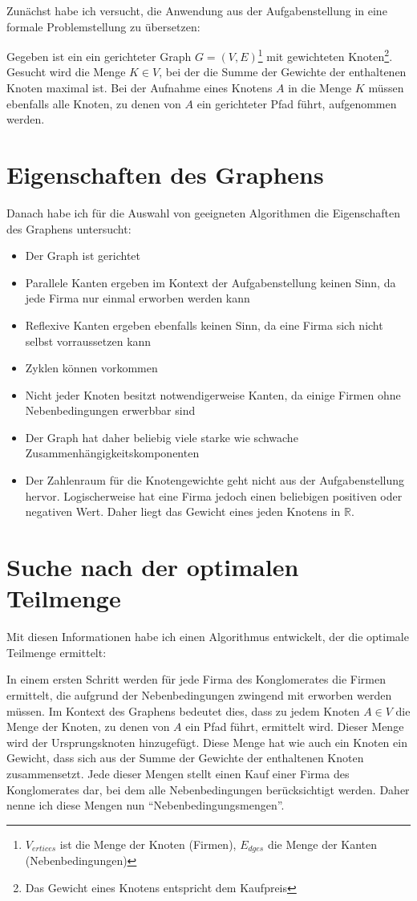 Zunächst habe ich versucht, die Anwendung aus der Aufgabenstellung in eine formale Problemstellung zu übersetzen:
\begin{displayquote}
	Gegeben ist ein ein gerichteter Graph \(G=(V,E)\)\footnote{\(V_{ertices}\) ist die Menge der Knoten (Firmen), \(E_{dges}\) die Menge der Kanten (Nebenbedingungen)} mit gewichteten Knoten\footnote{Das Gewicht eines Knotens entspricht dem Kaufpreis}. Gesucht wird die Menge \(K \in V\), bei der die Summe der Gewichte der enthaltenen Knoten maximal ist. Bei der Aufnahme eines Knotens  \(A\) in die Menge \(K\) müssen ebenfalls alle Knoten, zu denen von \(A\) ein gerichteter Pfad führt, aufgenommen werden.
\end{displayquote}

\section{Eigenschaften des Graphens}
Danach habe ich für die Auswahl von geeigneten Algorithmen die Eigenschaften des Graphens untersucht:
\begin{itemize}
	\item Der Graph ist gerichtet
	\item Parallele Kanten ergeben im Kontext der Aufgabenstellung keinen Sinn, da jede Firma nur einmal erworben werden kann
	\item Reflexive Kanten ergeben ebenfalls keinen Sinn, da eine Firma sich nicht selbst vorraussetzen kann
	\item Zyklen können vorkommen
	\item Nicht jeder Knoten besitzt notwendigerweise Kanten, da einige Firmen ohne Nebenbedingungen erwerbbar sind
	\item Der Graph hat daher beliebig viele starke wie schwache Zusammenhängigkeitskomponenten
	\item Der Zahlenraum für die Knotengewichte geht nicht aus der Aufgabenstellung hervor. Logischerweise hat eine Firma jedoch einen beliebigen positiven oder negativen Wert. Daher liegt das Gewicht eines jeden Knotens in \(\mathbb{R}\).
\end{itemize}

\section{Suche nach der optimalen Teilmenge}
Mit diesen Informationen habe ich einen Algorithmus entwickelt, der die optimale Teilmenge ermittelt:

In einem ersten Schritt werden für jede Firma des Konglomerates die Firmen ermittelt, die aufgrund der Nebenbedingungen zwingend mit erworben werden müssen. Im Kontext des Graphens bedeutet dies, dass zu jedem Knoten \(A \in V\) die Menge der Knoten, zu denen von \(A\) ein Pfad führt, ermittelt wird. 
Dieser Menge wird der Ursprungsknoten hinzugefügt. Diese Menge hat wie auch ein Knoten ein Gewicht, dass sich aus der Summe der Gewichte der enthaltenen Knoten zusammensetzt. Jede dieser Mengen stellt einen Kauf einer Firma des Konglomerates dar, bei dem alle Nebenbedingungen berücksichtigt werden. Daher nenne ich diese Mengen nun "`Nebenbedingungsmengen"'.

